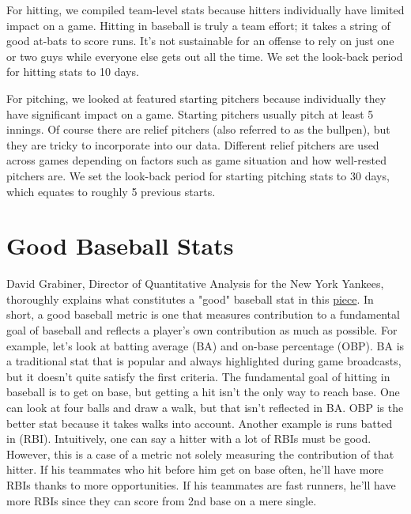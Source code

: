 \documentclass[12pt,onecolumn]{article}
\begin{document}
\noindent
For hitting, we compiled team-level stats because hitters individually have limited impact on a game. Hitting in baseball is truly a team effort; it takes a string of good at-bats to score runs. It's not sustainable for an offense to rely on just one or two guys while everyone else gets out all the time. We set the look-back period for hitting stats to 10 days. \vspace*{4mm}

\noindent
For pitching, we looked at featured starting pitchers because individually they have significant impact on a game. Starting pitchers usually pitch at least 5 innings. Of course there are relief pitchers (also referred to as the bullpen), but they are tricky to incorporate into our data. Different relief pitchers are used across games depending on factors such as game situation and how well-rested pitchers are. We set the look-back period for starting pitching stats to 30 days, which equates to roughly 5 previous starts.

\section*{Good Baseball Stats}
David Grabiner, Director of Quantitative Analysis for the New York Yankees, thoroughly explains what constitutes a "good" baseball stat in this \href{http://www.seanlahman.com/baseball-archive/sabermetrics/sabermetric-manifesto/}{piece}. In short, a good baseball metric is one that measures contribution to a fundamental goal of baseball and reflects a player's own contribution as much as possible. For example, let's look at batting average (BA) and on-base percentage (OBP). BA is a traditional stat that is popular and always highlighted during game broadcasts, but it doesn't quite satisfy the first criteria. The fundamental goal of hitting in baseball is to get on base, but getting a hit isn't the only way to reach base. One can look at four balls and draw a walk, but that isn't reflected in BA. OBP is the better stat because it takes walks into account. Another example is runs batted in (RBI). Intuitively, one can say a hitter with a lot of RBIs must be good. However, this is a case of a metric not solely measuring the contribution of that hitter. If his teammates who hit before him get on base often, he'll have more RBIs thanks to more opportunities. If his teammates are fast runners, he'll have more RBIs since they can score from 2nd base on a mere single.
\end{document}
